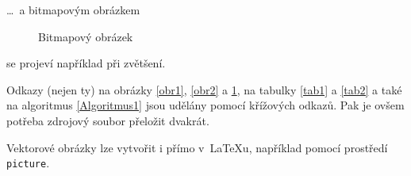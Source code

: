 \documentclass[a4paper, 11pt]{article}
\begin{document}
\dots~a bitmapovým obrázkem

\begin{figure}[ht]
    \centering
    \label{ObrazekEtiopan}
    \caption{Bitmapový obrázek}\label{obr3}
\end{figure}

se projeví například při zvětšení.

Odkazy (nejen ty) na obrázky \ref{obr1}, \ref{obr2} a \ref{obr3}, na tabulky \ref{tab1} a \ref{tab2} a také na algoritmus \ref{Algoritmus1} jsou udělány pomocí křížových odkazů. Pak je ovšem potřeba zdrojový soubor přeložit dvakrát.

Vektorové obrázky lze vytvořit i přímo v~\LaTeX u, například pomocí prostředí \texttt{picture}.

\newpage
\end{document}
